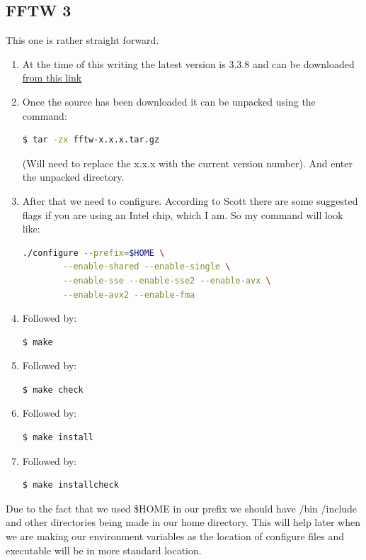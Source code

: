 \documentclass{article}
\begin{document}
   \subsection{FFTW 3}
    This one is rather straight forward. 
    \begin{enumerate}
    	\item At the time of this writing the latest version is 3.3.8 and can be downloaded \href{http://www.fftw.org/download.html}{from this link}
    	\item \noindent Once the source has been downloaded it can be unpacked using the command:
	    \begin{lstlisting}[language=bash]
	    $ tar -zx fftw-x.x.x.tar.gz 
	    \end{lstlisting}
    	(Will need to replace the x.x.x with the current version number). And enter the unpacked directory.
    	\item \noindent After that we need to configure. According to Scott there are some suggested flags if you are
    	using an Intel chip, which I am. So my command will look like: 
	    \begin{lstlisting}[language=bash]
	    ./configure --prefix=$HOME \
	    --enable-shared --enable-single \
	    --enable-sse --enable-sse2 --enable-avx \
	    --enable-avx2 --enable-fma
	    \end{lstlisting}
	    \item \noindent Followed by: \begin{lstlisting}[language=bash]
	    $ make
	    \end{lstlisting}
	    \item \noindent Followed by: 
		\begin{lstlisting}[language=bash]
		$ make check
		\end{lstlisting}
	    \item \noindent Followed by: 
		\begin{lstlisting}[language=bash]
		$ make install
		\end{lstlisting}
	    \item \noindent Followed by:
		\begin{lstlisting}[language=bash]
		 $ make installcheck
		\end{lstlisting}
    	\end{enumerate}
    	Due to the fact that we used \$HOME in our prefix we should have /bin /include and other directories
    	being made in our home directory. This will help later when we are making our environment variables
    	as the location of configure files and executable will be in more standard location.
    
\end{document}

